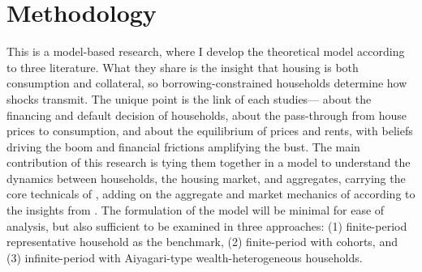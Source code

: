 \documentclass{style/fulbright}
\begin{document}
\section{Methodology}
This is a model-based research, where I develop the theoretical model according to three literature. What they
share is the insight that housing is both consumption and collateral, so borrowing-constrained households determine how shocks transmit. The unique point is the link of each studies— about the financing and default decision of households,  about the pass-through from house prices to consumption, and  about the equilibrium of prices and rents, with beliefs driving the boom and financial frictions amplifying the bust. The main contribution of this research is tying them together in a model to understand the dynamics between households, the housing market, and aggregates, carrying the core technicals of , adding on the aggregate and market mechanics of  according to the insights from . The formulation of the model will be minimal for ease of analysis, but also sufficient to be examined in three approaches: (1) finite-period representative household as the benchmark, (2) finite-period with cohorts, and (3) infinite-period with Aiyagari-type wealth-heterogeneous households.
\end{document}
